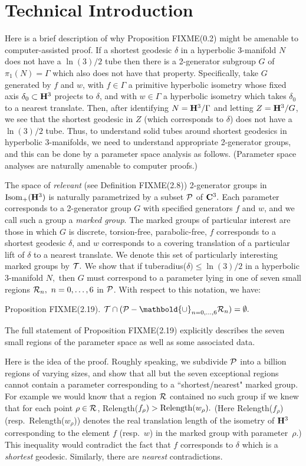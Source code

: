 \section{Technical Introduction}
Here is a brief description of why Proposition FIXME(0.2) might be amenable to 
computer-assisted proof.
If a shortest geodesic $\delta$ in a hyperbolic $3$-manifold $N$ does not have 
a $\ln(3)/2$
tube then there is a 2-generator subgroup $G$ of $\pi_1(N) = \Gamma$
which also does not have that property.
Specifically, take $G$ generated by $f$ and $w$,
with $f \in \Gamma$ a primitive hyperbolic isometry
whose fixed axis $\delta_0 \subset {\bf H}^3$ projects to $\delta$, and 
with $w \in \Gamma$ a hyperbolic isometry
which takes $\delta_0$ to a nearest translate.
Then, after identifying $N={\bf H}^3/\Gamma$ and letting 
$Z={\bf H}^3/G$,
we see that the shortest geodesic in $Z$ (which corresponds to $\delta$)
does not have 
a $\ln(3)/2$ tube. 
Thus, to understand solid tubes around shortest geodesics in hyperbolic 
$3$-manifolds, we need to understand appropriate 2-generator groups, and this 
can be done by a parameter space analysis as follows.  (Parameter space 
analyses are naturally amenable to 
computer proofs.)

The space of {\it relevant} (see Definition FIXME(2.8)) 2-generator groups 
in ${\rm Isom}_+({\bf H}^3)$ is naturally
parametrized by a subset ${\cal P}$ of ${\bf C}^3.$  
Each parameter corresponds to a
2-generator group $G$ with specified generators $f$ and $w$, and we call 
such a group a {\it marked group}. 
The marked groups of particular interest are those in which $G$ is
discrete, torsion-free, parabolic-free, $f$ corresponds to a shortest
geodesic $\delta$, and $w$ corresponds to a
covering translation of a particular lift of
$\delta$ to a nearest translate.  
We denote this set of particularly interesting marked groups by ${\cal T}.$
We show that if tuberadius($\delta) \le \ln(3)/2$ 
in a hyperbolic $3$-manifold $N,$ then 
$G$ must correspond to a parameter lying in one of seven small regions
${\cal R}_n,\ n=0,\ldots,6$ 
in ${\cal P}$.  
With respect to this notation, we have:

 {\elevensc Proposition FIXME(2.19)}.
${\cal T} \cap ({\cal P} - \mathbold{\cup}_{n=0,\ldots,6}{\cal R}_n) = \emptyset.$
\vfill

The full statement of Proposition FIXME(2.19)
explicitly describes the seven small
regions of the parameter space as well as some associated data.

Here is the idea of the proof.
Roughly speaking, we subdivide ${\cal P}$ into a billion regions
of varying sizes,
and show that all but the seven exceptional regions cannot contain 
a parameter corresponding to a  
``shortest/nearest" marked group.
For example we would know that 
a region ${\cal R}$ contained no such group if we knew that for each 
point $\rho\in {\cal R}$,
Relength($f_\rho) > {\rm Relength}(w_\rho).$  
(Here Relength($f_\rho$) (resp.\ Relength($w_\rho^{\phantom{|}}$))
denotes the real translation length of the isometry of ${\bf H}^3$ 
corresponding to
the element $f$ (resp.\ $w$) in the marked group with parameter~$\rho.$)
This inequality would contradict the fact that $f$ corresponds to $\delta$ 
which is a {\it shortest} geodesic.  Similarly, there are {\it nearest}
contradictions.
